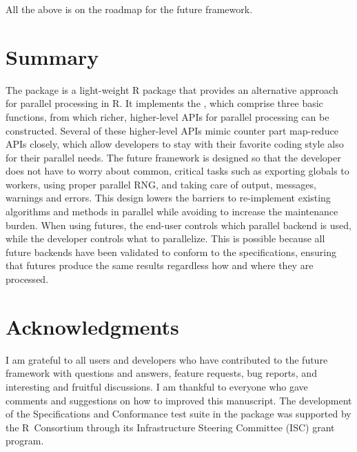 All the above is on the roadmap for the future framework.


\section{Summary}

The  package is a light-weight R package that provides an
alternative approach for parallel processing in R.  It implements
the , which comprise three basic functions, from which
richer, higher-level APIs for parallel processing can be constructed.
Several of these higher-level APIs mimic counter part map-reduce APIs
closely, which allow developers to stay with their favorite coding
style also for their parallel needs.  The future framework is designed
so that the developer does not have to worry about common, critical
tasks such as exporting globals to workers, using proper parallel RNG,
and taking care of output, messages, warnings and errors.  This design
lowers the barriers to re-implement existing algorithms and methods in
parallel while avoiding to increase the maintenance burden.  When
using futures, the end-user controls which parallel backend is used,
while the developer controls what to parallelize.  This is possible
because all future backends have been validated to conform to
the  specifications, ensuring that futures produce the
same results regardless how and where they are processed.


\section{Acknowledgments}
\label{acknowledgements}
 
I am grateful to all users and developers who have contributed to the
future framework with questions and answers, feature requests, bug
reports, and interesting and fruitful discussions.  I am thankful to
everyone who gave comments and suggestions on how to improved this
manuscript.  The development of the  Specifications
and Conformance test suite in the  package was
supported by the R~Consortium through its Infrastructure Steering
Committee (ISC) grant program.




\address{%
Henrik Bengtsson\\
Department of Epidemiology and Biostatistics,\\
University of California, San Francisco\\
San Francisco, CA\\
United States\\
}
